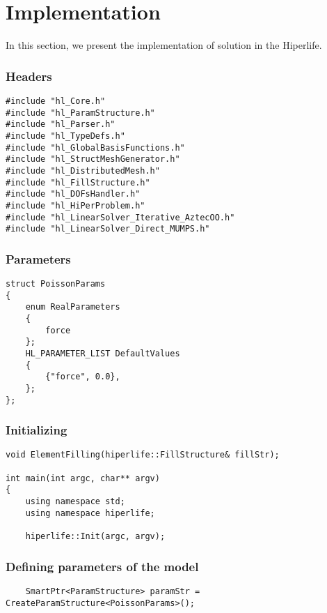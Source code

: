 \documentclass[]{article}
\begin{document}
\section{Implementation} \label{sec: imp}
In this section, we present the implementation of solution in the Hiperlife.
\subsubsection{Headers} \label{sec: hdr}
\begin{lstlisting}
#include "hl_Core.h"
#include "hl_ParamStructure.h"
#include "hl_Parser.h"
#include "hl_TypeDefs.h"
#include "hl_GlobalBasisFunctions.h"
#include "hl_StructMeshGenerator.h"
#include "hl_DistributedMesh.h"
#include "hl_FillStructure.h"
#include "hl_DOFsHandler.h"
#include "hl_HiPerProblem.h"
#include "hl_LinearSolver_Iterative_AztecOO.h"
#include "hl_LinearSolver_Direct_MUMPS.h"
\end{lstlisting}
	
\subsubsection{Parameters} \label{sec: ppr}
\begin{lstlisting}
struct PoissonParams
{
	enum RealParameters
	{
		force
	};	
	HL_PARAMETER_LIST DefaultValues
	{
		{"force", 0.0},
	};
};
\end{lstlisting}

\subsubsection{Initializing} \label{sec: main}
\begin{lstlisting}
void ElementFilling(hiperlife::FillStructure& fillStr);
	
int main(int argc, char** argv)
{
	using namespace std;
	using namespace hiperlife;
			
	hiperlife::Init(argc, argv);
\end{lstlisting}

\subsubsection{Defining parameters of the model} \label{sec: Pstr}
\begin{lstlisting}
	SmartPtr<ParamStructure> paramStr = CreateParamStructure<PoissonParams>();
\end{lstlisting}
\end{document}
